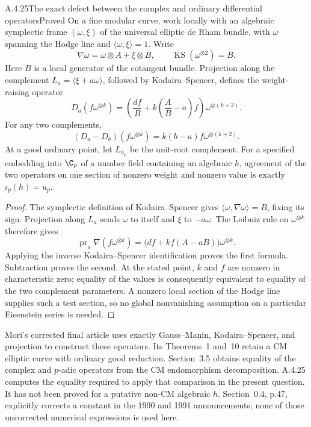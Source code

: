 \begin{result}{A.4.25}{The exact defect between the complex and ordinary differential operators}{Proved}
On a fine modular curve, work locally with an algebraic symplectic frame $(\omega,\xi)$ of the universal elliptic de Rham bundle, with $\omega$ spanning the Hodge line and $\langle\omega,\xi\rangle=1$. Write
\[
 \nabla\omega=\omega\otimes A+\xi\otimes B,
 \qquad \operatorname{KS}(\omega^{\otimes2})=B.
\]
Here $B$ is a local generator of the cotangent bundle. Projection along the complement $L_a=\langle\xi+a\omega\rangle$, followed by Kodaira--Spencer, defines the weight-raising operator
\[
 D_a(f\omega^{\otimes k})
 =\left(\frac{df}{B}+k\left(\frac AB-a\right)f\right)
   \omega^{\otimes(k+2)}.
\]
For any two complements,
\[
 (D_a-D_b)(f\omega^{\otimes k})
   =k(b-a)f\omega^{\otimes(k+2)}.
\]
At a good ordinary point, let $L_{u_p}$ be the unit-root complement. For a specified embedding into $\C_p$ of a number field containing an algebraic $h$, agreement of the two operators on one section of nonzero weight and nonzero value is exactly
$\iota_p(h)=u_p$.
\end{result}
\begin{proof}
The symplectic definition of Kodaira--Spencer gives
$\langle\omega,\nabla\omega\rangle=B$, fixing its sign. Projection along $L_a$ sends $\omega$ to itself and $\xi$ to $-a\omega$. The Leibniz rule on $\omega^{\otimes k}$ therefore gives
\[
 \operatorname{pr}_a\nabla(f\omega^{\otimes k})
 =\bigl(df+kf(A-aB)\bigr)\omega^{\otimes k}.
\]
Applying the inverse Kodaira--Spencer identification proves the first formula. Subtraction proves the second. At the stated point, $k$ and $f$ are nonzero in characteristic zero; equality of the values is consequently equivalent to equality of the two complement parameters. A nonzero local section of the Hodge line supplies such a test section, so no global nonvanishing assumption on a particular Eisenstein series is needed.
\end{proof}

Mori's corrected final article \cite[Sections 3.3--3.5, pp.56--57]{EllMori1994} uses exactly Gauss--Manin, Kodaira--Spencer, and projection to construct these operators. Its Theorems~1 and~10 retain a CM elliptic curve with ordinary good reduction. Section~3.5 obtains equality of the complex and $p$-adic operators from the CM endomorphism decomposition. A.4.25 computes the equality required to apply that comparison in the present question. It has not been proved for a putative non-CM algebraic $h$. Section~0.4, p.47, explicitly corrects a constant in the 1990 and 1991 announcements; none of those uncorrected numerical expressions is used here.

